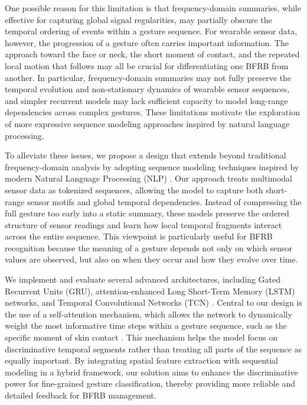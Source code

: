 \documentclass[conference]{IEEEtran}
\begin{document}
One possible reason for this limitation is that frequency-domain summaries, while effective for capturing global signal regularities, may partially obscure the temporal ordering of events within a gesture sequence. For wearable sensor data, however, the progression of a gesture often carries important information. The approach toward the face or neck, the short moment of contact, and the repeated local motion that follows may all be crucial for differentiating one BFRB from another. In particular, frequency-domain summaries may not fully preserve the temporal evolution and non-stationary dynamics of wearable sensor sequences, and simpler recurrent models may lack sufficient capacity to model long-range dependencies across complex gestures. These limitations motivate the exploration of more expressive sequence modeling approaches inspired by natural language processing.

To alleviate these issues, we propose a design that extends beyond traditional frequency-domain analysis by adopting sequence modeling techniques inspired by modern Natural Language Processing (NLP) \cite{vaswani2017attention}. Our approach treats multimodal sensor data as tokenized sequences, allowing the model to capture both short-range sensor motifs and global temporal dependencies. Instead of compressing the full gesture too early into a static summary, these models preserve the ordered structure of sensor readings and learn how local temporal fragments interact across the entire sequence. This viewpoint is particularly useful for BFRB recognition because the meaning of a gesture depends not only on which sensor values are observed, but also on when they occur and how they evolve over time.

We implement and evaluate several advanced architectures, including Gated Recurrent Units (GRU), attention-enhanced Long Short-Term Memory (LSTM) networks, and Temporal Convolutional Networks (TCN) \cite{hochreiter1997lstm, cho2014gru, lea2017tcn}. Central to our design is the use of a self-attention mechanism, which allows the network to dynamically weight the most informative time steps within a gesture sequence, such as the specific moment of skin contact \cite{vaswani2017attention}. This mechanism helps the model focus on discriminative temporal segments rather than treating all parts of the sequence as equally important. By integrating spatial feature extraction with sequential modeling in a hybrid framework, our solution aims to enhance the discriminative power for fine-grained gesture classification, thereby providing more reliable and detailed feedback for BFRB management.
\end{document}
